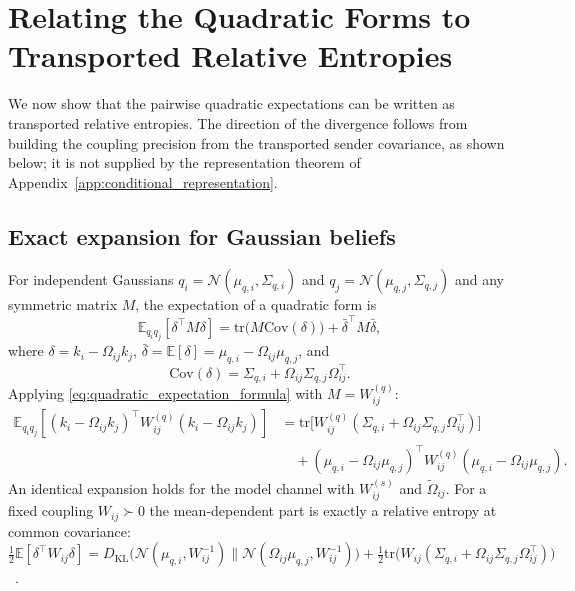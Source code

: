 \section{Relating the Quadratic Forms to Transported Relative Entropies}
We now show that the pairwise quadratic expectations can be written as transported relative entropies. The direction of the divergence follows from building the coupling precision from the transported sender covariance, as shown below; it is not supplied by the representation theorem of Appendix~\ref{app:conditional_representation}.
\subsection{Exact expansion for Gaussian beliefs}
For independent Gaussians $q_i = \mathcal{N}(\mu_{q,i},\Sigma_{q,i})$ and $q_j = \mathcal{N}(\mu_{q,j},\Sigma_{q,j})$ and any symmetric matrix $M$, the expectation of a quadratic form is
\begin{equation}
\mathbb{E}_{q_i q_j}[\delta^\top M \delta]
= \mathrm{tr}\big(M\mathrm{Cov}(\delta)\big)
+ \bar{\delta}^\top M \bar{\delta},
\label{eq:quadratic_expectation_formula}
\end{equation}
where $\delta = k_i - \Omega_{ij}k_j$, $\bar{\delta} = \mathbb{E}[\delta] = \mu_{q,i} - \Omega_{ij}\mu_{q,j}$, and
\begin{equation}
\mathrm{Cov}(\delta) = \Sigma_{q,i} + \Omega_{ij}\Sigma_{q,j}\Omega_{ij}^\top.
\end{equation}
Applying \eqref{eq:quadratic_expectation_formula} with $M = W^{(q)}_{ij}$:
\begin{equation}
\begin{aligned}
\mathbb{E}_{q_i q_j}
[(k_i-\Omega_{ij}k_j)^\top W^{(q)}_{ij}(k_i-\Omega_{ij}k_j)]
&=\mathrm{tr}\big[W^{(q)}_{ij}(\Sigma_{q,i}+\Omega_{ij}\Sigma_{q,j}\Omega_{ij}^\top)\big]\\
&\quad+(\mu_{q,i}-\Omega_{ij}\mu_{q,j})^\top
W^{(q)}_{ij}
(\mu_{q,i}-\Omega_{ij}\mu_{q,j}).
\end{aligned}
\label{eq:belief_quadratic_expansion}
\end{equation}
An identical expansion holds for the model channel with $W^{(s)}_{ij}$ and $\tilde{\Omega}_{ij}$. For a fixed coupling $W_{ij} \succ 0$ the mean-dependent part is exactly a relative entropy at common covariance: $\tfrac{1}{2}\mathbb{E}[\delta^\top W_{ij}\delta] = D_{\mathrm{KL}}\big(\mathcal{N}(\mu_{q,i}, W_{ij}^{-1})\|\mathcal{N}(\Omega_{ij}\mu_{q,j}, W_{ij}^{-1})\big) + \tfrac{1}{2}\mathrm{tr}\big(W_{ij}(\Sigma_{q,i} + \Omega_{ij}\Sigma_{q,j}\Omega_{ij}^\top)\big)$~\cite[Ch.~G5, edge relative entropy at fixed covariance]{DennisGaugeVFESuppG2026}.

